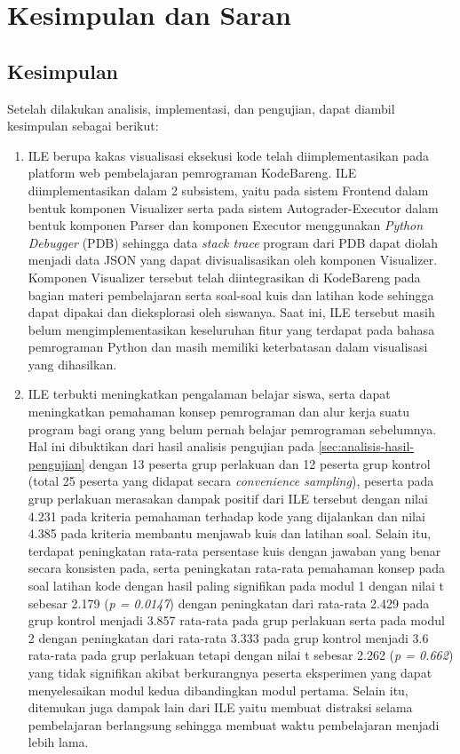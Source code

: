 \chapter{Kesimpulan dan Saran}


\section{Kesimpulan}
Setelah dilakukan analisis, implementasi, dan pengujian, dapat diambil kesimpulan sebagai berikut:
\begin{enumerate}
  \item ILE berupa kakas visualisasi eksekusi kode telah diimplementasikan pada platform web pembelajaran pemrograman KodeBareng. ILE diimplementasikan dalam 2 subsistem, yaitu pada sistem Frontend dalam bentuk komponen Visualizer serta pada sistem Autograder-Executor dalam bentuk komponen Parser dan komponen Executor menggunakan \textit{Python Debugger} (PDB) sehingga data \textit{stack trace} program dari PDB dapat diolah menjadi data JSON yang dapat divisualisasikan oleh komponen Visualizer. Komponen Visualizer tersebut telah diintegrasikan di KodeBareng pada bagian materi pembelajaran serta soal-soal kuis dan latihan kode sehingga dapat dipakai dan dieksplorasi oleh siswanya. Saat ini, ILE tersebut masih belum mengimplementasikan keseluruhan fitur yang terdapat pada bahasa pemrograman Python dan masih memiliki keterbatasan dalam visualisasi yang dihasilkan.
  \item ILE terbukti meningkatkan pengalaman belajar siswa, serta dapat meningkatkan pemahaman konsep pemrograman dan alur kerja suatu program bagi orang yang belum pernah belajar pemrograman sebelumnya. Hal ini dibuktikan dari hasil analisis pengujian pada \autoref{sec:analisis-hasil-pengujian} dengan 13 peserta grup perlakuan dan 12 peserta grup kontrol (total 25 peserta yang didapat secara \textit{convenience sampling}), peserta pada grup perlakuan merasakan dampak positif dari ILE tersebut dengan nilai 4.231 pada kriteria pemahaman terhadap kode yang dijalankan dan nilai 4.385 pada kriteria membantu menjawab kuis dan latihan soal. Selain itu, terdapat peningkatan rata-rata persentase kuis dengan jawaban yang benar secara konsisten pada, serta peningkatan rata-rata pemahaman konsep pada soal latihan kode dengan hasil paling signifikan pada modul 1 dengan nilai t sebesar 2.179 (\textit{p = 0.0147}) dengan peningkatan dari rata-rata 2.429 pada grup kontrol menjadi 3.857 rata-rata pada grup perlakuan serta pada modul 2 dengan peningkatan dari rata-rata 3.333 pada grup kontrol menjadi 3.6 rata-rata pada grup perlakuan tetapi dengan nilai t sebesar 2.262 (\textit{p = 0.662}) yang tidak signifikan akibat berkurangnya peserta eksperimen yang dapat menyelesaikan modul kedua dibandingkan modul pertama. Selain itu, ditemukan juga dampak lain dari ILE yaitu membuat distraksi selama pembelajaran berlangsung sehingga membuat waktu pembelajaran menjadi lebih lama.

\end{enumerate}
